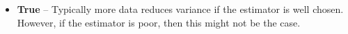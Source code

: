 \begin{itemize}
   \item[] {\bf True} -- Typically more data reduces variance if the estimator is well chosen. However, if the estimator is poor, then this might not be the case. 
\end{itemize}
